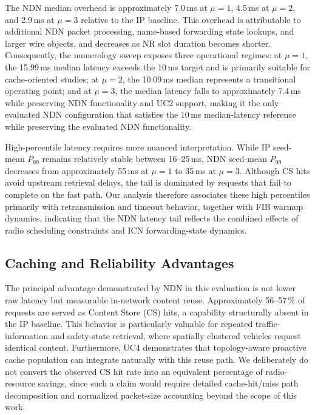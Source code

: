 \documentclass[journal]{IEEEtran}
\begin{document}
The NDN median overhead is approximately 7.0\,ms at $\mu=1$, 4.5\,ms at $\mu=2$, and 2.9\,ms at $\mu=3$ relative to the IP baseline. This overhead is attributable to additional NDN packet processing, name-based forwarding state lookups, and larger wire objects, and decreases as NR slot duration becomes shorter. Consequently, the numerology sweep exposes three operational regimes: at $\mu=1$, the 15.99\,ms median latency exceeds the 10\,ms target and is primarily suitable for cache-oriented studies; at $\mu=2$, the 10.09\,ms median represents a transitional operating point; and at $\mu=3$, the median latency falls to approximately 7.4\,ms while preserving NDN functionality and UC2 support, making it the only evaluated NDN configuration that satisfies the 10\,ms median-latency reference while preserving the evaluated NDN functionality.

High-percentile latency requires more nuanced interpretation. While IP seed-mean $P_{99}$ remains relatively stable between 16--25\,ms, NDN seed-mean $P_{99}$ decreases from approximately 55\,ms at $\mu=1$ to 35\,ms at $\mu=3$. Although CS hits avoid upstream retrieval delays, the tail is dominated by requests that fail to complete on the fast path. Our analysis therefore associates these high percentiles primarily with retransmission and timeout behavior, together with FIB warmup dynamics, indicating that the NDN latency tail reflects the combined effects of radio scheduling constraints and ICN forwarding-state dynamics.

\subsection{Caching and Reliability Advantages}

The principal advantage demonstrated by NDN in this evaluation is not lower raw latency but measurable in-network content reuse. Approximately 56--57\,\% of requests are served as Content Store (CS) hits, a capability structurally absent in the IP baseline. This behavior is particularly valuable for repeated traffic-information and safety-state retrieval, where spatially clustered vehicles request identical content. Furthermore, UC4 demonstrates that topology-aware proactive cache population can integrate naturally with this reuse path. We deliberately do not convert the observed CS hit rate into an equivalent percentage of radio-resource savings, since such a claim would require detailed cache-hit/miss path decomposition and normalized packet-size accounting beyond the scope of this work.
\end{document}
